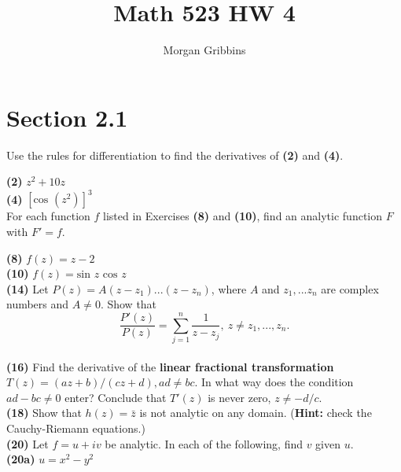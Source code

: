 \documentclass[12pt,letterpaper]{article}
\title{Math 523 HW 4}
\author{Morgan Gribbins}
\date{}
\begin{document}
	
\maketitle

\section*{Section 2.1}

Use the rules for differentiation to find the derivatives of \textbf{(2)} and \textbf{(4)}.

\textbf{(2)} \(z^{2} + 10z\) \\



\textbf{(4)} \([\text{cos } (z^{2})]^{3}\) \\



For each function \(f\) listed in Exercises \textbf{(8)} and \textbf{(10)}, find an analytic function \(F\) with \(F' = f\).

\textbf{(8)} \(f(z) = z - 2\) \\



\textbf{(10)} \(f(z) = \text{sin } z \text{ cos } z \) \\




\textbf{(14)} Let \(P(z) = A(z - z_{1})...(z-z_{n})\), where \(A\) and \(z_{1},...z_{n}\) are complex numbers and \(A \neq 0\). Show that \[\frac{P'(z)}{P(z)} = \sum_{j=1}^{n}\frac{1}{z-z_{j}},\ z \neq z_{1},...,z_{n}.\] \\



\textbf{(16)} Find the derivative of the \textbf{linear fractional transformation} \(T(z) = (az+b)/(cz+d), ad \neq bc.\) In what way does the condition \(ad - bc \neq 0\) enter? Conclude that \(T'(z)\) is never zero, \(z \neq -d/c\). \\



\textbf{(18)} Show that \(h(z) = \bar{z}\) is not analytic on any domain. (\textbf{Hint:} check the Cauchy-Riemann equations.) \\



\textbf{(20)} Let \(f = u + iv\) be analytic. In each of the following, find \(v\) given \(u\). \\

\textbf{(20a)} \(u = x^{2} - y^{2}\) \\
\end{document}
